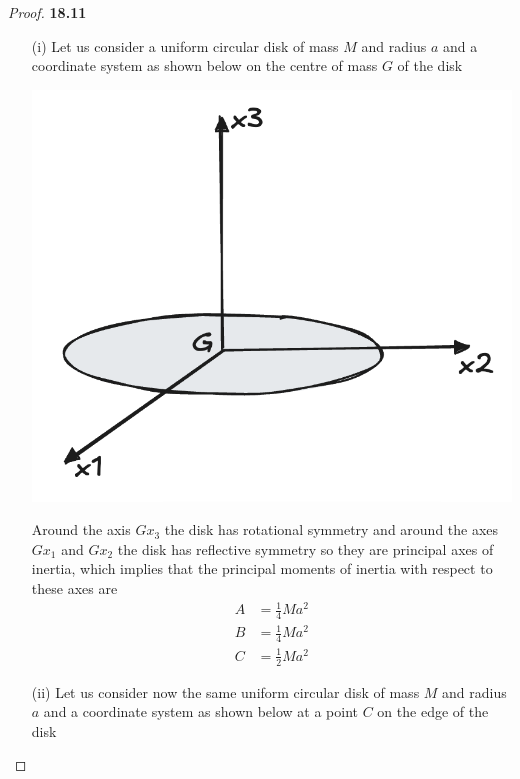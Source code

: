 \documentclass[11pt]{article}
\theoremstyle{definition}
\begin{document}
\begin{proof}{\textbf{18.11}}
\begin{itemize}
    \item [(i)] Let us consider a uniform circular disk of mass $M$ and radius
    $a$ and a coordinate system as shown below on the centre of mass $G$ of the 
    disk
    \begin{center}
        \includegraphics[scale=0.25]{ch18-11-i.png}
    \end{center}
    Around the axis $Gx_3$ the disk has rotational symmetry and around the axes
    $Gx_1$ and $Gx_2$ the disk has reflective symmetry so they are principal 
    axes of inertia, which implies that the principal moments of inertia
    with respect to these axes are
    \begin{align*}
        A &= \frac{1}{4}Ma^2\\
        B &= \frac{1}{4}Ma^2\\
        C &= \frac{1}{2}Ma^2
    \end{align*}
    \item [(ii)] Let us consider now the same uniform circular disk of mass $M$
    and radius $a$ and a coordinate system as shown below at a point $C$ on the
    edge of the disk
    \begin{center}

\end{center}
\end{itemize}
\end{proof}
\end{document}
